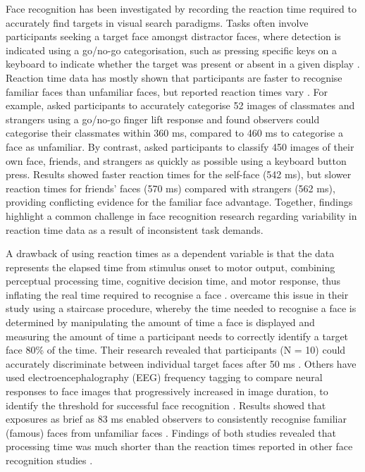 \documentclass[
  10pt,
  letterpaper,
]{article}
\begin{document}
Face recognition has been investigated by recording the reaction time
required to accurately find targets in visual search paradigms. Tasks
often involve participants seeking a target face amongst distractor
faces, where detection is indicated using a go/no-go categorisation,
such as pressing specific keys on a keyboard to indicate whether the
target was present or absent in a given display
\citep{kloth2006a, ramon2011a, tong1999a}. Reaction time data has mostly
shown that participants are faster to recognise familiar faces than
unfamiliar faces, but reported reaction times vary
\citep{burton2015a, ramon2011a, ramon2017a}. For example,
\citet{ramon2011a} asked participants to accurately categorise 52 images
of classmates and strangers using a go/no-go finger lift response and
found observers could categorise their classmates within 360 ms,
compared to 460 ms to categorise a face as unfamiliar. By contrast,
\citet{alzueta2019a} asked participants to classify 450 images of their
own face, friends, and strangers as quickly as possible using a keyboard
button press. Results showed faster reaction times for the self-face
(542 ms), but slower reaction times for friends' faces (570 ms) compared
with strangers (562 ms), providing conflicting evidence for the familiar
face advantage. Together, findings highlight a common challenge in face
recognition research regarding variability in reaction time data as a
result of inconsistent task demands.

A drawback of using reaction times as a dependent variable is that the
data represents the elapsed time from stimulus onset to motor output,
combining perceptual processing time, cognitive decision time, and motor
response, thus inflating the real time required to recognise a face
\citep{alzueta2019a, burton2015a, caharel2014a}. \citet{taubert2011a}
overcame this issue in their study using a staircase procedure, whereby
the time needed to recognise a face is determined by manipulating the
amount of time a face is displayed and measuring the amount of time a
participant needs to correctly identify a target face 80\% of the time.
Their research revealed that participants (N = 10) could accurately
discriminate between individual target faces after 50 ms
\citep{taubert2011a}. Others have used electroencephalography (EEG)
frequency tagging to compare neural responses to face images that
progressively increased in image duration, to identify the threshold for
successful face recognition \citep{quek2021a}. Results showed that
exposures as brief as 83 ms enabled observers to consistently recognise
familiar (famous) faces from unfamiliar faces \citep{quek2021a}.
Findings of both studies revealed that processing time was much shorter
than the reaction times reported in other face recognition studies
\citep{besson2016a, blauch2021a, oruc2019a}.
\end{document}
